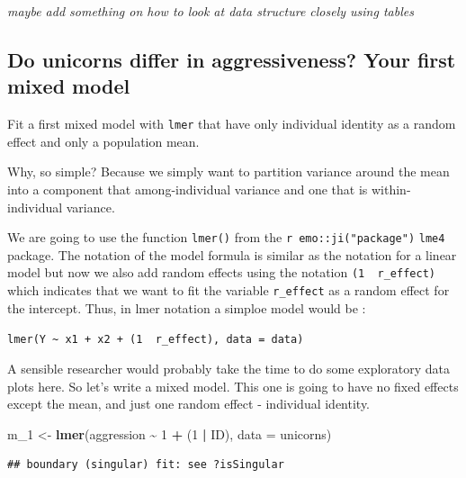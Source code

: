 \documentclass[
  12pt,
]{book}
\makeatletter
\newenvironment{Shaded}{\begin{snugshade}}{\end{snugshade}}
\newcommand{\DataTypeTok}[1]{\textcolor[rgb]{0.13,0.29,0.53}{#1}}
\newcommand{\DecValTok}[1]{\textcolor[rgb]{0.00,0.00,0.81}{#1}}
\newcommand{\KeywordTok}[1]{\textcolor[rgb]{0.13,0.29,0.53}{\textbf{#1}}}
\newcommand{\NormalTok}[1]{#1}
\newcommand{\OperatorTok}[1]{\textcolor[rgb]{0.81,0.36,0.00}{\textbf{#1}}}
\newcommand{\StringTok}[1]{\textcolor[rgb]{0.31,0.60,0.02}{#1}}
\newenvironment{kframe}{%
\medskip{}
\setlength{\fboxsep}{.8em}
\def\at@end@of@kframe{}%
\ifinner\ifhmode%
 \def\at@end@of@kframe{\end{minipage}}%
 \begin{minipage}{\columnwidth}%
\fi\fi%
\def\FrameCommand##1{\hskip\@totalleftmargin \hskip-\fboxsep
\colorbox{incolor}{##1}\hskip-\fboxsep
    \hskip-\linewidth \hskip-\@totalleftmargin \hskip\columnwidth}%
\MakeFramed {\advance\hsize-\width
  \@totalleftmargin\z@ \linewidth\hsize
  \@setminipage}}%
{\par\unskip\endMakeFramed%
\at@end@of@kframe}
\newenvironment{rmdblock}[1]
 {
 \begin{itemize}
 \renewcommand{\labelitemi}{
   \raisebox{-.7\height}[0pt][0pt]{
     {\setkeys{Gin}{width=3em,keepaspectratio}\texttt{[image: images/icons/\#1]}}
   }
 }
 \begin{kframe}
 \setlength{\fboxsep}{1em}
 \item
 }
 {
 \end{kframe}
 \end{itemize}
 }
\newenvironment{rmdimportant}
  {\begin{rmdblock}{important}}
  {\end{rmdblock}}
\makeatother
\begin{document}
\emph{maybe add something on how to look at data structure closely using tables}

\hypertarget{do-unicorns-differ-in-aggressiveness-your-first-mixed-model}{%
\subsection{Do unicorns differ in aggressiveness? Your first mixed model}\label{do-unicorns-differ-in-aggressiveness-your-first-mixed-model}}

Fit a first mixed model with \texttt{lmer} that have only individual identity as a random effect and only a population mean.

Why, so simple? Because we simply want to partition variance around the mean into a component that among-individual variance and one that is within-individual variance.

\begin{rmdimportant}
We are going to use the function \texttt{lmer()} from the \texttt{r\ emo::ji("package")} \texttt{lme4} package. The notation of the model formula is similar as the notation for a linear model but now we also add random effects using the notation \texttt{(1\ \textbar{}\ r\_effect)} which indicates that we want to fit the variable \texttt{r\_effect} as a random effect for the intercept. Thus, in lmer notation a simploe model would be :

\texttt{lmer(Y\ \textasciitilde{}\ x1\ +\ x2\ +\ (1\ \textbar{}\ r\_effect),\ data\ =\ data)}
\end{rmdimportant}

A sensible researcher would probably take the time to do some exploratory data plots here. So let's write a mixed model. This one is going to have no fixed effects except the mean, and just one random effect - individual identity.

\begin{Shaded}
\begin{Highlighting}[]
\NormalTok{m\_}\DecValTok{1}\NormalTok{ \textless{}{-}}\StringTok{ }\KeywordTok{lmer}\NormalTok{(aggression }\OperatorTok{\textasciitilde{}}\StringTok{ }\DecValTok{1} \OperatorTok{+}\StringTok{ }\NormalTok{(}\DecValTok{1} \OperatorTok{|}\StringTok{ }\NormalTok{ID), }\DataTypeTok{data =}\NormalTok{ unicorns)}
\end{Highlighting}
\end{Shaded}

\begin{verbatim}
## boundary (singular) fit: see ?isSingular
\end{verbatim}
\end{document}
